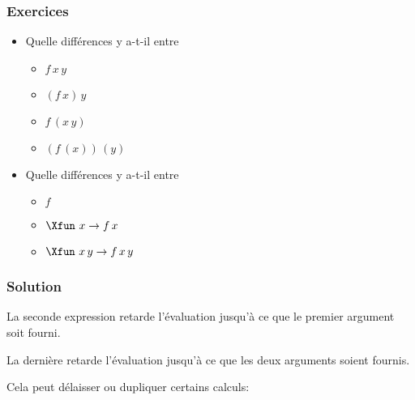 %
\begin{frame}
\frametitle{Exercices}

\begin{itemize}

  \item Quelle différences y a-t-il entre 

  \begin{itemize}
  
    \item $f \, x \, y$

    \item $(f \, x) \, y$

    \item $f \, (x \, y)$

    \item $(f \, (x)) \, (y)$

  \end{itemize}

  \item Quelle différences y a-t-il entre 
  \begin{itemize}

    \item $f$

    \item $\Xfun \,\, x \rightarrow f \, x$

    \item $\Xfun \,\, x \, y \rightarrow f \, x \, y$

  \end{itemize}

\end{itemize}

\end{frame}

%
\begin{frame}
\frametitle{Solution}

La seconde expression retarde l'évaluation jusqu'à ce que le premier
argument soit fourni.

\bigskip

La dernière retarde l'évaluation jusqu'à ce que les deux arguments
soient fournis.

\bigskip

Cela peut délaisser ou dupliquer certains calculs:

\bigskip







\end{frame}

